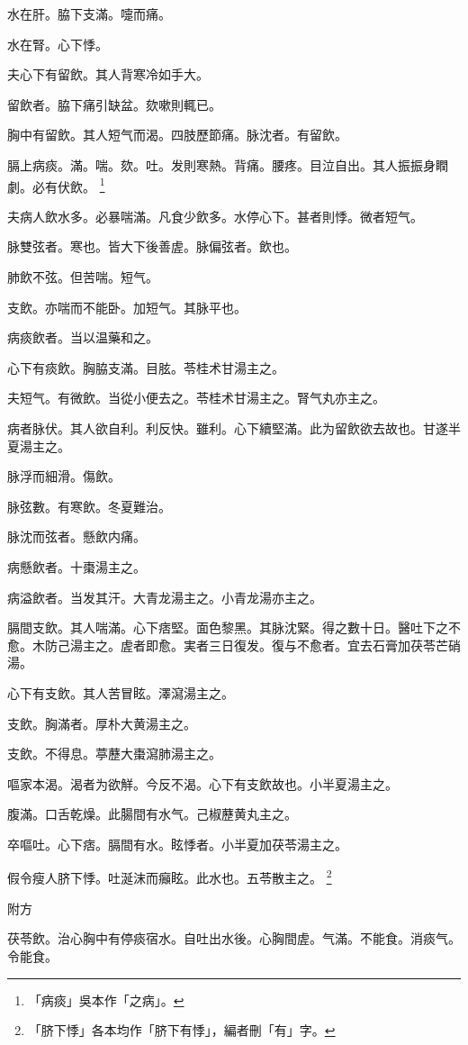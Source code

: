 \documentclass[12pt,twoside,UTF8,b5paper]{ctexbook}
\begin{document}
水在肝。脇下支滿。嚏而痛。

水在腎。心下悸。

夫心下有留飲。其人背寒冷如手大。

留飲者。脇下痛引缺盆。欬嗽則輒已。

胸中有留飲。其人短气而渴。四肢歷節痛。脉沈者。有留飲。

膈上病痰。滿。喘。欬。吐。发則寒熱。背痛。腰疼。目泣自出。其人振振身瞤劇。必有伏飲。
	\footnote{「病痰」吳本作「之病」。}

夫病人飲水多。必暴喘滿。凡食少飲多。水停心下。甚者則悸。微者短气。

脉雙弦者。寒也。皆大下後善虗。脉偏弦者。飲也。

肺飲不弦。但苦喘。短气。

支飲。亦喘而不能卧。加短气。其脉平也。

病痰飲者。当以温藥和之。

心下有痰飲。胸脇支滿。目胘。苓桂术甘湯主之。

夫短气。有微飲。当從小便去之。苓桂术甘湯主之。腎气丸亦主之。

病者脉伏。其人欲自利。利反快。雖利。心下續堅滿。此为留飲欲去故也。甘遂半夏湯主之。

脉浮而細滑。傷飲。

脉弦數。有寒飲。冬夏難治。

脉沈而弦者。懸飲内痛。

病懸飲者。十棗湯主之。

病溢飲者。当发其汗。大青龙湯主之。小青龙湯亦主之。

膈間支飲。其人喘滿。心下痞堅。面色黎黑。其脉沈緊。得之數十日。醫吐下之不愈。木防己湯主之。虗者即愈。実者三日復发。復与不愈者。宜去石膏加茯苓芒硝湯。

心下有支飲。其人苦冒眩。澤瀉湯主之。

支飲。胸滿者。厚朴大黄湯主之。

支飲。不得息。葶藶大棗瀉肺湯主之。

嘔家本渴。渴者为欲觧。今反不渴。心下有支飲故也。小半夏湯主之。

腹滿。口舌乾燥。此腸間有水气。己椒藶黄丸主之。

卒嘔吐。心下痞。膈間有水。眩悸者。{小}半夏加茯苓湯主之。

假令瘦人脐下悸。吐涎沫而癲眩。此水也。五苓散主之。
	\footnote{「脐下悸」各本均作「脐下有悸」，編者刪「有」字。}

附方

茯苓飲。治心胸中有停痰宿水。自吐出水後。心胸間虗。气滿。不能食。消痰气。令能食。
\end{document}
